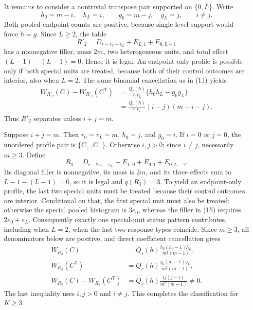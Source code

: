 It remains to consider a nontrivial transpose pair supported on \(\{0,L\}\). Write
\[
 h_0=m-i,\quad h_L=i,\qquad
 g_0=m-j,\quad g_L=j,
 \qquad i\neq j.
 \tag{12}
\]
Both pooled endpoint counts are positive, because single-level support would force \(h=g\). Since \(L\geq2\), the table
\[
 R'_2=D_{r-e_0-e_L}+E_{L,1}+E_{0,L-1}
 \tag{13}
\]
has a nonnegative filler, mass \(2m\), two heterogeneous units, and total effect \((L-1)-(L-1)=0\). Hence it is legal. An endpoint-only profile is possible only if both special units are treated, because both of their control outcomes are interior, also when \(L=2\). The same binomial cancellation as in (11) yields
\[
 \begin{aligned}
 W_{R'_2}(C)-W_{R'_2}(C^{\mathsf T})
 &=\frac{Q_r(h)}{r_0r_L}\{h_0h_L-g_0g_L\}\\
 &=\frac{Q_r(h)}{r_0r_L}(i-j)(m-i-j).
 \end{aligned}
 \tag{14}
\]
Thus \(R'_2\) separates unless \(i+j=m\).

Suppose \(i+j=m\). Then \(r_0=r_L=m\), \(h_0=j\), and \(g_0=i\). If \(i=0\) or \(j=0\), the unordered profile pair is \(\{C_+,C_-\}\). Otherwise \(i,j>0\); since \(i\neq j\), necessarily \(m\geq3\). Define
\[
 R_3=D_{r-2e_0-e_L}+E_{L,0}+E_{0,1}+E_{0,L-1}.
 \tag{15}
\]
Its diagonal filler is nonnegative, its mass is \(2m\), and its three effects sum to \(L-1-(L-1)=0\), so it is legal and \(q(R_3)=3\). To yield an endpoint-only profile, the last two special units must be treated because their control outcomes are interior. Conditional on that, the first special unit must also be treated: otherwise the special pooled histogram is \(3e_0\), whereas the filler in (15) requires \(2e_0+e_L\). Consequently exactly one special-unit status pattern contributes, including when \(L=2\), when the last two response types coincide. Since \(m\geq3\), all denominators below are positive, and direct coefficient cancellation gives
\[
 \begin{aligned}
 W_{R_3}(C)
 &=Q_r(h)\frac{h_0(h_0-1)h_L}{m^2(m-1)},\\
 W_{R_3}(C^{\mathsf T})
 &=Q_r(h)\frac{g_0(g_0-1)g_L}{m^2(m-1)},\\
 W_{R_3}(C)-W_{R_3}(C^{\mathsf T})
 &=Q_r(h)\frac{ij(j-i)}{m^2(m-1)}\neq0.
 \end{aligned}
 \tag{16}
\]
The last inequality uses \(i,j>0\) and \(i\neq j\). This completes the classification for \(K\geq3\).


